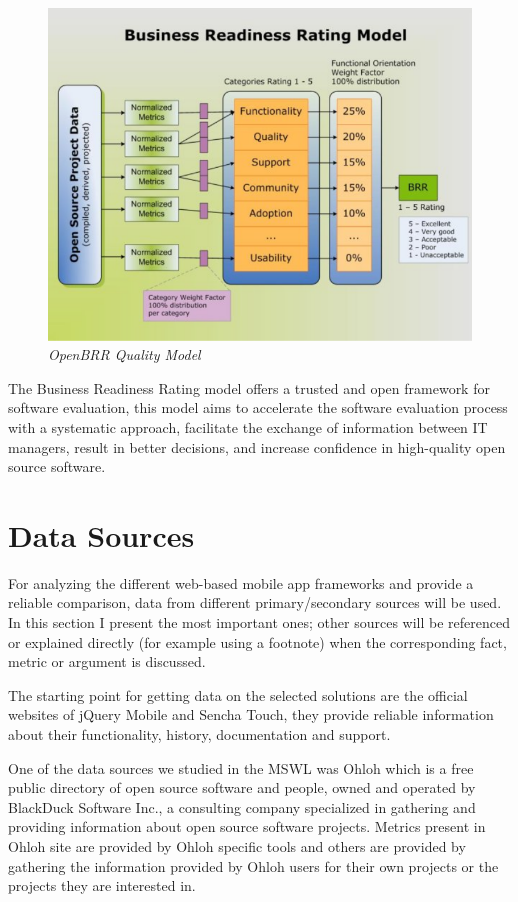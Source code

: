 \documentclass[a4paper,12pt]{book}
\begin{document}
\begin{figure}[H]
    \centering
    \includegraphics[width=12cm, keepaspectratio]{img/openbrr.png}
    \caption{\textit{OpenBRR Quality Model}}
    \label{figure:openbrr}
 \end{figure}

The Business Readiness Rating model offers a trusted and open framework for software evaluation, this model aims to accelerate the software evaluation process with a systematic approach, facilitate the exchange of information between IT managers, result in better decisions, and increase confidence in high-quality open source software.

\section{Data Sources}
\label{sec:data}

For analyzing the different web-based mobile app frameworks and provide a reliable comparison, data from different primary/secondary sources will be used. In this section I present the most important ones; other sources will be referenced or explained directly (for example using a footnote) when the corresponding fact, metric or argument is discussed.

The starting point for getting data on the selected solutions are the official websites of jQuery Mobile\cite{jquery} and Sencha Touch\cite{sencha}, they provide reliable information about their functionality, history, documentation and support. 

One of the data sources we studied in the MSWL was Ohloh\cite{Ohloh} which is a free public
directory of open source software and people, owned and operated by BlackDuck Software Inc., a consulting company specialized in gathering and providing information about open source software projects. Metrics present in Ohloh site are provided by Ohloh specific tools and others are provided by gathering the information provided by Ohloh users for their own projects or the projects they are interested in.
\end{document}
